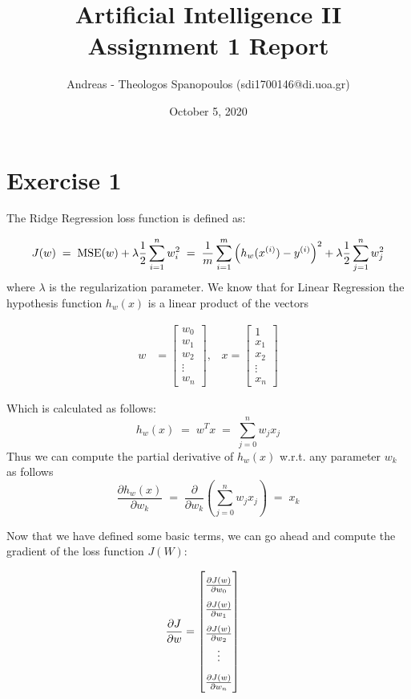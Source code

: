 \documentclass[12pt]{report}
\title{Artificial Intelligence II \\ Assignment 1 Report}
\author{Andreas - Theologos Spanopoulos (sdi1700146@di.uoa.gr)}
\date{October 5, 2020}
\begin{document}
\maketitle

\section*{Exercise 1}
The Ridge Regression loss function is defined as:

\begin{equation}
    J(w) \;=\; \text{MSE}(w) + \lambda\frac{1}{2}\sum_{i=1}^n w_i^2
         \;=\; \frac{1}{m} \sum_{i=1}^m \left(h_w(x^{(i)}) - y^{(i)}\right)^2 + \lambda\frac{1}{2}\sum_{j=1}^n w_j^2 \\
\end{equation}
where $\lambda$ is the regularization parameter.
We know that for Linear Regression the hypothesis function $h_w(x)$ is a linear product of the vectors

\begin{align*}
    w &= 
        \begin{bmatrix}
            w_0 \\
            w_1 \\
            w_2 \\           
            \vdots \\
            w_n
        \end{bmatrix}
    ,\;\;\;x = 
        \begin{bmatrix}
            1 \\
            x_1 \\
            x_2 \\
            \vdots \\
            x_n
        \end{bmatrix}
\end{align*}

\noindent Which is calculated as follows: $$h_w(x) \;=\; w^Tx \;=\; \sum_{j=0}^n w_jx_j$$
Thus we can compute the partial derivative of $h_w(x)$ w.r.t. any parameter $w_k$ as follows
$$\frac{\partial h_w(x)}{\partial w_k} \;=\;
\frac{\partial}{\partial w_k} \left(\sum_{j=0}^n w_jx_j \right) \;=\;
x_k$$

\noindent Now that we have defined some basic terms, we can go ahead and compute the gradient of the loss function $J(W)$:

\begin{align*}
    \frac{\partial J}{\partial w} &=
    \renewcommand\arraystretch{1.8}
        \begin{bmatrix}
            \frac{\partial J(w)}{\partial w_0} \\
            \frac{\partial J(w)}{\partial w_1} \\
            \frac{\partial J(w)}{\partial w_2} \\
            \vdots \\
            \frac{\partial J(w)}{\partial w_n}
        \end{bmatrix}
\end{align*}
\end{document}
